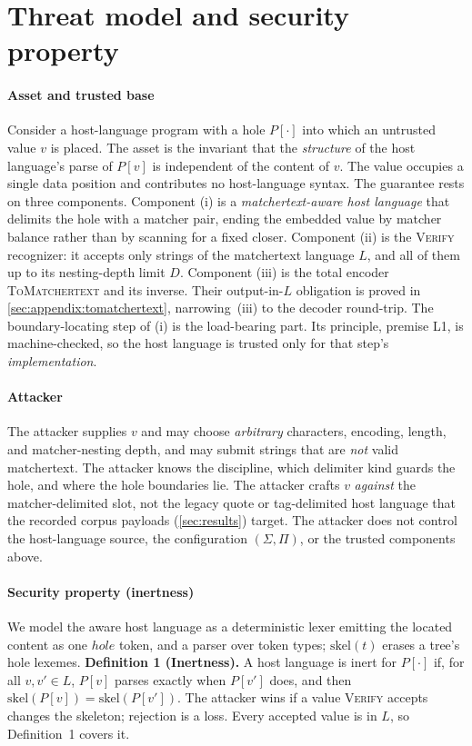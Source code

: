 \section{Threat model and security property}
\label{sec:threat}

\paragraph{Asset and trusted base}
Consider a host-language program with a hole $P[\cdot]$ into which an untrusted value
$v$ is placed. The asset is the invariant that the \emph{structure} of the
host language's parse of $P[v]$ is independent of the content of $v$. The value
occupies a single data position and contributes no host-language syntax. The guarantee
rests on three components. Component (i) is a \emph{matchertext-aware host language}
that delimits the hole with a matcher pair, ending the embedded value by
matcher balance rather than by scanning for a fixed closer. Component (ii)
is the \textsc{Verify} recognizer: it accepts only strings of the matchertext
language $L$, and all of them up to its nesting-depth limit $D$. Component (iii) is the total encoder \textsc{ToMatchertext} and
its inverse. Their output-in-$L$ obligation is proved in
\cref{sec:appendix:tomatchertext}, narrowing~(iii) to the decoder round-trip.
The boundary-locating step of (i) is the load-bearing part. Its principle,
premise L1, is machine-checked, so the host language is trusted only
for that step's \emph{implementation}.

\paragraph{Attacker}
The attacker supplies $v$ and may choose \emph{arbitrary} characters, encoding,
length, and matcher-nesting depth, and may submit strings that are \emph{not}
valid matchertext.
The attacker knows the discipline, which delimiter kind
guards the hole, and where the hole boundaries lie. The attacker crafts $v$
\emph{against} the matcher-delimited slot, not the legacy quote or tag-delimited
host language that the recorded corpus payloads (\cref{sec:results}) target.
The attacker does not control the host-language source, the configuration $(\Sigma,\Pi)$,
or the trusted components above.

\paragraph{Security property (inertness)}
We model the aware host language as a deterministic lexer emitting the located content as
one $\mathit{hole}$ token, and a parser over token types; $\mathrm{skel}(t)$ erases
a tree's hole lexemes.
\textbf{Definition 1 (Inertness).} A host language is inert for $P[\cdot]$ if, for
all $v,v'\in L$, $P[v]$ parses exactly when $P[v']$ does, and then
$\mathrm{skel}(P[v])=\mathrm{skel}(P[v'])$.
The attacker wins if a value \textsc{Verify} accepts changes the skeleton; rejection
is a loss. Every accepted value is in $L$, so Definition~1 covers it.

